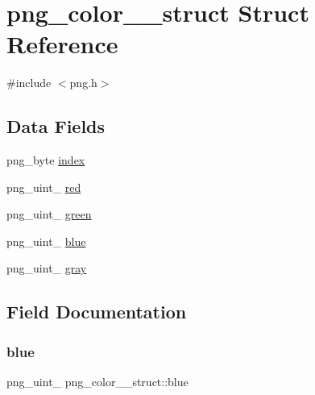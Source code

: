 \hypertarget{structpng__color__16__struct}{}\section{png\+\_\+color\+\_\+\_\+struct Struct Reference}
\label{structpng__color__16__struct}


{\ttfamily \#include $<$png.\+h$>$}

\subsection*{Data Fields}
\begin{DoxyCompactItemize}
\item 
png\+\_\+byte \hyperlink{structpng__color__16__struct_a44a918da0d9a50cf94fcad5a3c741ee0}{index}
\item 
png\+\_\+uint\+\_ \hyperlink{structpng__color__16__struct_a069bad345aefbe4eab29fcc1d8af91e6}{red}
\item 
png\+\_\+uint\+\_ \hyperlink{structpng__color__16__struct_af01259ffd46c78eff9b1ad584a295126}{green}
\item 
png\+\_\+uint\+\_ \hyperlink{structpng__color__16__struct_afd68833319d436582aa5911de7cdd46b}{blue}
\item 
png\+\_\+uint\+\_ \hyperlink{structpng__color__16__struct_a660a572a0a2f4094408f2fecb61571ac}{gray}
\end{DoxyCompactItemize}


\subsection{Field Documentation}
\mbox{\label{structpng__color__16__struct_afd68833319d436582aa5911de7cdd46b}} 
\subsubsection{\texorpdfstring{blue}{blue}}
{\footnotesize\ttfamily png\+\_\+uint\+\_ png\+\_\+color\+\_\+\_\+struct\+::blue}

\mbox{\label{structpng__color__16__struct_a660a572a0a2f4094408f2fecb61571ac}} 
